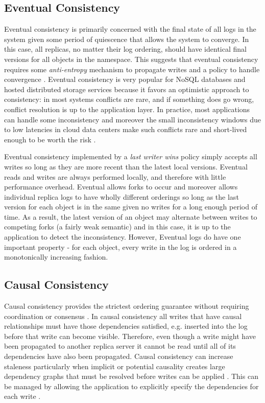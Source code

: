 \documentclass[10pt,conference,letterpaper]{IEEEtran}
\begin{document}
\subsection{Eventual Consistency}

Eventual consistency is primarily concerned with the final state of all logs in the system given some period of quiescence that allows the system to converge. In this case, all replicas, no matter their log ordering, should have identical final versions for all objects in the namespace. This suggests that eventual consistency requires some \textit{anti-entropy} mechanism to propagate writes and a policy to handle convergence \cite{terry_managing_1995}. Eventual consistency is very popular for NoSQL databases and hosted distributed storage services \cite{decandia_dynamo:_2007,lakshman_cassandra:_2010} because it favors an optimistic approach to consistency: in most systems conflicts are rare, and if something does go wrong, conflict resolution is up to the application layer. In practice, most applications can handle some inconsistency and moreover the small inconsistency windows due to low latencies in cloud data centers make such conflicts rare and short-lived enough to be worth the risk \cite{bailis_quantifying_2014}.

Eventual consistency implemented by a \textit{last writer wins} policy simply accepts all writes so long as they are more recent than the latest local versions. Eventual reads and writes are always performed locally, and therefore with little performance overhead. Eventual allows forks to occur and moreover allows individual replica logs to have wholly different orderings so long as the last version for each object is in the same given no writes for a long enough period of time. As a result, the latest version of an object may alternate between writes to competing forks (a fairly weak semantic) and in this case, it is up to the application to detect the inconsistency. However, Eventual logs do have one important property - for each object, every write in the log is ordered in a monotonically increasing fashion.

\subsection{Causal Consistency}

Causal consistency provides the strictest ordering guarantee without requiring coordination or consensus \cite{ladin_providing_1992}. In causal consistency all writes that have causal relationships must have those dependencies satisfied, e.g. inserted into the log before that write can become visible. Therefore, even though a write might have been propagated to another replica server it cannot be read until all of its dependencies have also been propagated. Causal consistency can increase staleness particularly when implicit or potential causality creates large dependency graphs that must be resolved before writes can be applied \cite{lloyd_dont_2011}. This can be managed by allowing the application to explicitly specify the dependencies for each write \cite{bailis_potential_2012}.
\end{document}
